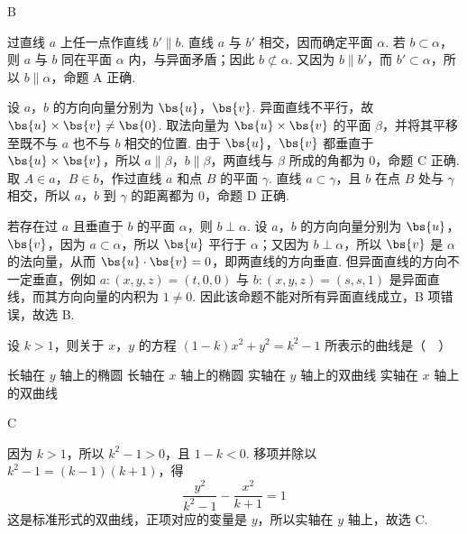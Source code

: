 \documentclass[UTF8,a4paper,oneside,11pt]{ctexbook}
\begin{document}
\begin{answer}
B
\end{answer}

\begin{solution}
过直线 \(a\) 上任一点作直线 \(b'\parallel b\). 直线 \(a\) 与 \(b'\) 相交，因而确定平面 \(\alpha\). 若 \(b\subset\alpha\)，则 \(a\) 与 \(b\) 同在平面 \(\alpha\) 内，与异面矛盾；因此 \(b\not\subset\alpha\). 又因为 \(b\parallel b'\)，而 \(b'\subset\alpha\)，所以 \(b\parallel\alpha\)，命题 A 正确.

设 \(a\)，\(b\) 的方向向量分别为 \(\bs{u}\)，\(\bs{v}\). 异面直线不平行，故 \(\bs{u}\times\bs{v}\neq\bs{0}\). 取法向量为 \(\bs{u}\times\bs{v}\) 的平面 \(\beta\)，并将其平移至既不与 \(a\) 也不与 \(b\) 相交的位置. 由于 \(\bs{u}\)，\(\bs{v}\) 都垂直于 \(\bs{u}\times\bs{v}\)，所以 \(a\parallel\beta\)，\(b\parallel\beta\)，两直线与 \(\beta\) 所成的角都为 \(0\)，命题 C 正确. 取 \(A\in a\)，\(B\in b\)，作过直线 \(a\) 和点 \(B\) 的平面 \(\gamma\). 直线 \(a\subset\gamma\)，且 \(b\) 在点 \(B\) 处与 \(\gamma\) 相交，所以 \(a\)，\(b\) 到 \(\gamma\) 的距离都为 \(0\)，命题 D 正确.

若存在过 \(a\) 且垂直于 \(b\) 的平面 \(\alpha\)，则 \(b\perp\alpha\). 设 \(a\)，\(b\) 的方向向量分别为 \(\bs{u}\)，\(\bs{v}\)，因为 \(a\subset\alpha\)，所以 \(\bs{u}\) 平行于 \(\alpha\)；又因为 \(b\perp\alpha\)，所以 \(\bs{v}\) 是 \(\alpha\) 的法向量，从而 \(\bs{u}\cdot\bs{v}=0\)，即两直线的方向垂直. 但异面直线的方向不一定垂直，例如 \(a:(x,y,z)=(t,0,0)\) 与 \(b:(x,y,z)=(s,s,1)\) 是异面直线，而其方向向量的内积为 \(1\neq0\). 因此该命题不能对所有异面直线成立，B 项错误，故选 B.
\end{solution}

\begin{problem}
设 \(k > 1\)，则关于 \(x\)，\(y\) 的方程 \((1 - k)x^{2} + y^{2} = k^{2} - 1\) 所表示的曲线是（\(\quad\)）

\choices
    {长轴在 \(y\) 轴上的椭圆}
    {长轴在 \(x\) 轴上的椭圆}
    {实轴在 \(y\) 轴上的双曲线}
    {实轴在 \(x\) 轴上的双曲线}
\end{problem}

\begin{answer}
C
\end{answer}

\begin{solution}
因为 \(k>1\)，所以 \(k^2-1>0\)，且 \(1-k<0\). 移项并除以 \(k^2-1=(k-1)(k+1)\)，得
\[
\frac{y^2}{k^2-1}-\frac{x^2}{k+1}=1
\]
这是标准形式的双曲线，正项对应的变量是 \(y\)，所以实轴在 \(y\) 轴上，故选 C.
\end{solution}
\end{document}
